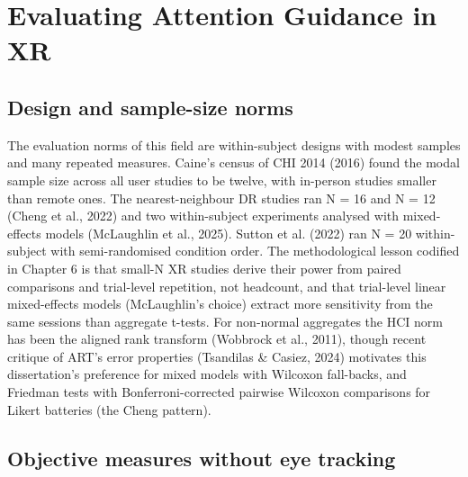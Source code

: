 \section{Evaluating Attention Guidance in XR}

\subsection{Design and sample-size norms}

The evaluation norms of this field are within-subject designs with modest samples and many repeated
measures. Caine's census of CHI 2014 (2016) found the modal sample size across all user studies to
be twelve, with in-person studies smaller than remote ones. The nearest-neighbour DR studies ran
N = 16 and N = 12 (Cheng et al., 2022) and two within-subject experiments analysed with
mixed-effects models (McLaughlin et al., 2025). Sutton et al. (2022) ran N = 20 within-subject with
semi-randomised condition order. The methodological lesson codified in Chapter 6 is that small-N XR
studies derive their power from paired comparisons and trial-level repetition, not headcount, and
that trial-level linear mixed-effects models (McLaughlin's choice) extract more sensitivity from the
same sessions than aggregate t-tests. For non-normal aggregates the HCI norm has been the aligned
rank transform (Wobbrock et al., 2011), though recent critique of ART's error properties (Tsandilas
\& Casiez, 2024) motivates this dissertation's preference for mixed models with
Wilcoxon fall-backs, and Friedman tests with Bonferroni-corrected pairwise Wilcoxon comparisons for
Likert batteries (the Cheng pattern).

\subsection{Objective measures without eye tracking}

